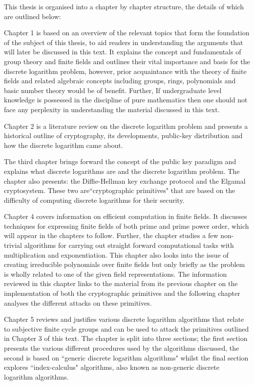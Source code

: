 \documentclass[iwp,first]{luthesis}
\begin{document}
This thesis is organised into a chapter by chapter structure, the details of which are outlined below:

Chapter 1 is based on an overview of the relevant topics that form the foundation of the subject of this thesis, to aid readers in understanding the arguments that will later be discussed in this text. It explains the concept and fundamentals of group theory and finite fields and outlines their vital importance and basis for the discrete logarithm problem, however, prior acquaintance with the theory of finite fields and related algebraic concepts including groups, rings, polynomials and basic number theory would be of benefit. Further,  If undergraduate level knowledge is possessed in the discipline of pure mathematics then one should not face any perplexity in understanding the material discussed in this text.

Chapter 2 is a literature review on the discrete logarithm problem and presents a historical outline of cryptography, its developments, public-key distribution and how the discrete logarithm came about. 

The third chapter brings forward the concept of the public key paradigm and explains what discrete logarithms are and the discrete logarithm problem. The chapter also presents: the Diffie-Hellman key exchange protocol and the Elgamal cryptosystem. These two are``cryptographic primitives" that are based on the difficulty of computing discrete logarithms for their security.

Chapter 4 covers information on efficient computation in finite fields. It discusses techniques for expressing finite fields of both prime and prime power order, which will appear in the chapters to follow. Further, the chapter studies a few non-trivial algorithms for carrying out straight forward computational tasks with multiplication and exponentiation. This chapter also looks into the issue of creating irreducible polynomials over finite fields but only briefly as the problem is wholly related to one of the given field representations. The information reviewed in this chapter links to the material from its previous chapter on the implementation of both the cryptographic primitives and the following chapter analyses the different attacks on these primitives.

Chapter 5 reviews and justifies various discrete logarithm algorithms that relate to subjective finite cycle groups and can be used to attack the primitives outlined in Chapter 3 of this text. The chapter is split into three sections; the first section presents the various different procedures used by the algorithms discussed, the second is based on ``generic discrete logarithm algorithms" whilst the final section explores ``index-calculus" algorithms, also known as non-generic discrete logarithm algorithms.
\end{document}

